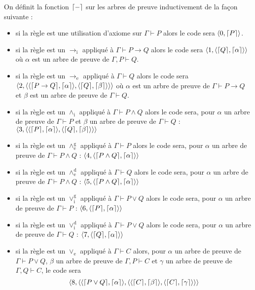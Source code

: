 \begin{defi}
    On définit la fonction $\lceil - \rceil$ sur les arbres de preuve inductivement de la façon suivante :
    \begin{itemize}[label=$\bullet$]
        \item si la règle est une utilisation d'axiome sur $\Gamma\vdash P$ alors le code sera $\langle 0,\lceil P \rceil\rangle$.
        \item si la règle est un $\to_\mathrm i$ appliqué à $\Gamma\vdash P\to Q$ alors le code sera $\langle 1,\langle \lceil Q \rceil,\lceil \alpha \rceil\rangle\rangle$ où $\alpha$ est un arbre de preuve de $\Gamma,P\vdash Q$.
        \item si la règle est un $\to_\mathrm e$ appliqué à $\Gamma\vdash Q$ alors le code sera $\langle 2,\langle\langle\lceil P\to Q \rceil,\lceil \alpha \rceil\rangle,\langle \lceil Q \rceil,\lceil \beta \rceil\rangle\rangle\rangle$ où $\alpha$ est un arbre de preuve de $\Gamma\vdash P \to Q$ et $\beta$ est un arbre de preuve de $\Gamma\vdash Q$.
        \item si la règle est un $\land_\mathrm i$ appliqué à $\Gamma\vdash P\land Q$ alors le code sera, pour $\alpha$ un arbre de preuve de $\Gamma\vdash P$ et $\beta$ un arbre de preuve de $\Gamma\vdash Q$ : $\langle 3,\langle \langle \lceil P \rceil,\lceil \alpha \rceil \rangle,\langle\lceil Q \rceil,\lceil \beta \rceil\rangle \rangle\rangle$
        \item si la règle est un $\land_\mathrm e^\mathrm g$ appliqué à $\Gamma\vdash P$ alors le code sera, pour $\alpha$ un arbre de preuve de $\Gamma\vdash P\land Q$ : $\langle 4,\langle \lceil P\land Q \rceil,\lceil \alpha \rceil\rangle\rangle$
        \item si la règle est un $\land_\mathrm e^\mathrm d$ appliqué à $\Gamma\vdash Q$ alors le code sera, pour $\alpha$ un arbre de preuve de $\Gamma\vdash P\land Q$ : $\langle 5,\langle \lceil P\land Q \rceil,\lceil \alpha \rceil\rangle\rangle$
        \item si la règle est un $\lor_\mathrm i^\mathrm g$ appliqué à $\Gamma\vdash P\lor Q$ alors le code sera, pour $\alpha$ un arbre de preuve de $\Gamma\vdash P$ : $\langle 6,\langle \lceil P \rceil,\lceil \alpha \rceil\rangle\rangle$
        \item si la règle est un $\lor_\mathrm i^\mathrm d$ appliqué à $\Gamma\vdash P\lor Q$ alors le code sera, pour $\alpha$ un arbre de preuve de $\Gamma\vdash Q$ : $\langle 7,\langle \lceil Q \rceil,\lceil \alpha \rceil\rangle\rangle$
        \item si la règle est un $\lor_\mathrm e$ appliqué à $\Gamma\vdash C$ alors, pour $\alpha$ un arbre de preuve de $\Gamma\vdash P\lor Q$, $\beta$ un arbre de preuve de $\Gamma,P\vdash C$ et $\gamma$ un arbre de preuve de $\Gamma,Q\vdash C$, le code sera $$\langle 8,\langle \langle \lceil P\lor Q \rceil,\lceil \alpha \rceil \rangle,\langle \langle \lceil C \rceil,\lceil \beta \rceil\rangle,\langle\lceil C \rceil,\lceil \gamma \rceil\rangle  \rangle\rangle$$

\end{itemize}
\end{defi}
